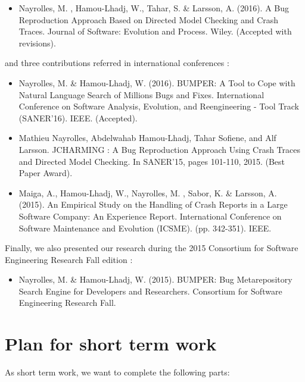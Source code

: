 \begin{itemize}
	\item Nayrolles, M. , Hamou-Lhadj, W., Tahar, S. & Larsson, A. (2016). A Bug Reproduction Approach Based on Directed Model Checking and Crash Traces. Journal of Software: Evolution and Process. Wiley. (Accepted with revisions).
\end{itemize}

and three contributions referred in international conferences \cite{Nayrolles2015,Maiga2014,Nayrolles2016b, Nayrolles2016c}:

\begin{itemize}
	\item Nayrolles, M. \& Hamou-Lhadj, W. (2016). BUMPER: A Tool to Cope with Natural Language Search of Millions Bugs and Fixes. International Conference on Software Analysis, Evolution, and Reengineering - Tool Track (SANER'16). IEEE. (Accepted).
	\item Mathieu Nayrolles, Abdelwahab Hamou-Lhadj, Tahar Sofiene, and Alf Larsson. JCHARMING : A Bug Reproduction Approach Using Crash Traces and Directed Model Checking. In SANER'15, pages 101-110, 2015. (Best Paper Award).
	\item Maiga, A., Hamou-Lhadj, W., Nayrolles, M. , Sabor, K. \& Larsson, A. (2015). An Empirical Study on the Handling of Crash Reports in a Large Software Company: An Experience Report. International Conference on Software Maintenance and Evolution (ICSME). (pp. 342-351). IEEE.
\end{itemize}

Finally, we also presented our research during the 2015 Consortium for Software Engineering Research Fall edition \cite{Nayrolles2015e}:

\begin{itemize}
	\item Nayrolles, M. \& Hamou-Lhadj, W. (2015). BUMPER: Bug Metarepository Search Engine for Developers and Researchers. Consortium for Software Engineering Research Fall.
\end{itemize}

\section{Plan for short term work\label{sec:planning}}

As short term work, we want to complete the following parts:

